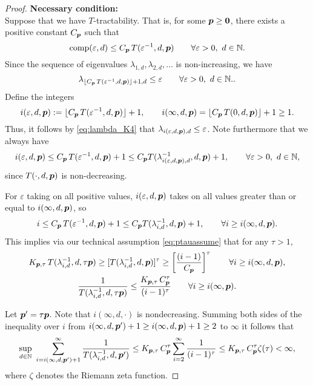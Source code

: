 \documentclass[11pt,a4paper]{article}
\begin{document}
\begin{proof}
\noindent \textbf{Necessary condition:}\\
Suppose that we have
$T$-tractability. That is, for some $\boldsymbol{p} \ge \boldsymbol{0}$, there exists a positive constant $C_{\boldsymbol{p}}$ such that
\[
\operatorname{comp}(\varepsilon,d)\le C_{\boldsymbol{p}}\, T(\varepsilon^{-1},d,\boldsymbol{p}) \qquad \forall \varepsilon > 0,  \ d \in \mathbb{N}.
\]
Since the sequence of eigenvalues $\lambda_{1,d}, \lambda_{2,d}, \ldots $ is non-increasing, we have
\begin{equation}\label{eq:lambda_K4}
	\lambda_{\lfloor C_{\boldsymbol{p}}\, T(\varepsilon^{-1},d,\boldsymbol{p})\rfloor +1,d}\le \varepsilon \qquad \forall \varepsilon > 0,  \ d \in \mathbb{N}..
\end{equation}
Define the integers
\[
i (\varepsilon,d,\boldsymbol{p}):= \lfloor C_{\boldsymbol{p}}\, T(\varepsilon^{-1},d,\boldsymbol{p})\rfloor +1, \qquad
i (\infty,d,\boldsymbol{p}) = \lfloor C_{\boldsymbol{p}}\, T(0,d,\boldsymbol{p})\rfloor +1 \ge 1.
\]
Thus, it follows by \eqref{eq:lambda_K4} that $\lambda_{i(\varepsilon,d,\boldsymbol{p}),d} \le \varepsilon$.
Note furthermore that we always have
\[
i(\varepsilon,d,\boldsymbol{p})\le C_{\boldsymbol{p}}\, T(\varepsilon^{-1},d,\boldsymbol{p})+1 \le C_{\boldsymbol{p}} T(\lambda_{i(\varepsilon,d,\boldsymbol{p}),d}^{-1},d,\boldsymbol{p})+1, \qquad \forall \varepsilon > 0, \ d \in \mathbb{N},
\]
since
$T(\cdot,d,\boldsymbol{p})$ is non-decreasing.

For $\varepsilon$ taking on all positive values, $i(\varepsilon,d,\boldsymbol{p})$ takes on all values greater than or equal to $i(\infty,d,\boldsymbol{p})$, so
\[
i\le C_{\boldsymbol{p}}\, T(\varepsilon^{-1},d,\boldsymbol{p})+1 \le C_{\boldsymbol{p}} T(\lambda_{i,d}^{-1},d,\boldsymbol{p})+1, \qquad \forall i \ge i(\infty,d,\boldsymbol{p}).
\]
This implies via our technical assumption \eqref{eq:ptauassume} that for any $\tau > 1$,
\begin{gather*}
	K_{\boldsymbol{p},\tau}\,T (\lambda_{i,d}^{-1},d,\tau \boldsymbol{p}) \ge
	[T(\lambda_{i,d}^{-1},d, \boldsymbol{p})]^\tau
	\ge
	\left[\frac{(i-1)}{C_{\boldsymbol{p}}}\right]^\tau \qquad \forall i \ge i(\infty,d,\boldsymbol{p}), \\
	 \frac{1}{T (\lambda_{i,d}^{-1},d,\tau \boldsymbol{p})} \le
	\frac{K_{\boldsymbol{p},\tau}\, C_{\boldsymbol{p}}^\tau}{(i-1)^\tau}\qquad \forall i \ge i(\infty,\boldsymbol{p}).
\end{gather*}

Let $\boldsymbol{p}' = \tau \boldsymbol{p}$.  Note that $i(\infty,d,\cdot)$ is nondecreasing.  Summing both sides of the inequality over $i$ from $i(\infty,d,\boldsymbol{p}') + 1 \ge i(\infty,d, \boldsymbol{p}) + 1 \ge 2$ to $\infty$ it follows that
\begin{equation*}
	\sup_{d\in\mathbb{N}} \, \, \sum_{i=i (\infty,d,\boldsymbol{p}')+1}^\infty \frac{1}{T (\lambda_{i,d}^{-1},d,\boldsymbol{p}')}
	 \le  K_{\boldsymbol{p},\tau}\, C_{\boldsymbol{p}}^\tau
	\sum_{i=2}^\infty \frac{1}{(i-1)^\tau} \\
	 \le  K_{\boldsymbol{p},\tau}\, C_{\boldsymbol{p}}^\tau
	\zeta (\tau)  < \infty,
\end{equation*}
where $\zeta$ denotes the Riemann zeta function.



\end{proof}
\end{document}
